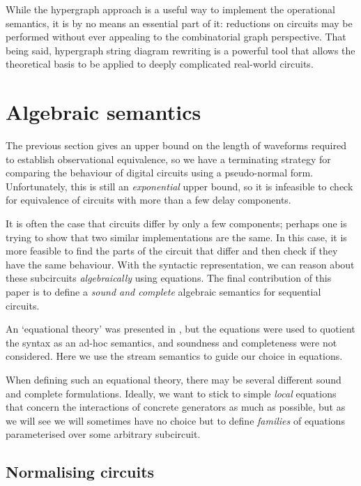 \documentclass{lmcs}
\begin{document}
While the hypergraph approach is a useful way to implement the operational
semantics, it is by no means an essential part of it: reductions on circuits may
be performed without ever appealing to the combinatorial graph perspective.
That being said, hypergraph string diagram rewriting is a powerful tool that
allows the theoretical basis to be applied to deeply complicated real-world
circuits.

\section{Algebraic semantics}

The previous section gives an upper bound on the length of waveforms required to
establish observational equivalence, so we have a terminating strategy
for comparing the behaviour of digital circuits using a
pseudo-normal form.
Unfortunately, this is still an \emph{exponential} upper bound, so it is
infeasible to check for equivalence of circuits with more than a few
delay components.

It is often the case that circuits differ by only a few components;
perhaps one is trying to show that two similar implementations are the same.
In this case, it is more feasible to find the parts of the circuit that differ
and then check if they have the same behaviour.
With the syntactic representation, we can reason about these subcircuits
\emph{algebraically} using equations.
The final contribution of this paper is to define a \emph{sound and complete}
algebraic semantics for sequential circuits.

\begin{rem}
    An `equational theory' was presented in \cite{ghica2016categorical},
    but the equations were used to quotient the syntax as an ad-hoc semantics,
    and soundness and completeness were not considered.
    Here we use the stream semantics to guide our choice in equations.
\end{rem}

When defining such an equational theory, there may be several different sound
and complete formulations.
Ideally, we want to stick to simple \emph{local} equations that concern the
interactions of concrete generators as much as possible, but as we will see
we will sometimes have no choice but to define \emph{families} of equations
parameterised over some arbitrary subcircuit.

\subsection{Normalising circuits}\label{sec:normalising}
\end{document}
